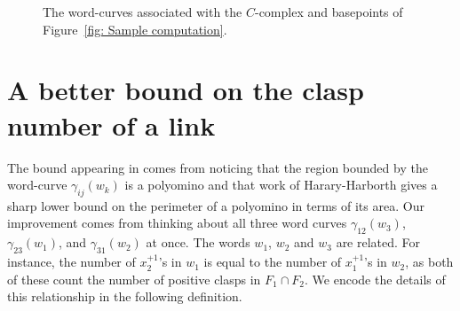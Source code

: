 \documentclass[11pt]{amsart}
\theoremstyle{remark}
\begin{document}
\begin{figure}
\centering
     \hspace{.1\textwidth}
     \hspace{.1\textwidth}
     
        \caption{The word-curves associated with the $C$-complex and basepoints of Figure~\ref{fig: Sample computation}.}
        \label{fig: word curves}
\end{figure}



\section{A better bound on the clasp number of a link} \label{sect: lower bound}

The bound appearing in \cite[Theorem 5]{AADG20} comes from noticing that the region bounded by the word-curve $\gamma_{ij}(w_k)$ is a polyomino and that work of Harary-Harborth \cite{HH76} gives a sharp lower bound on the perimeter of a polyomino in terms of its area.  Our improvement comes from thinking about all three word curves $\gamma_{12}(w_3)$, $\gamma_{23}(w_1)$, and $\gamma_{31}(w_2)$ at once.  The words $w_1$, $w_2$ and $w_3$ are related.  For instance, the number of $x_2^{+1}$'s in $w_1$ is equal to the number of $x_1^{+1}$'s in $w_2$, as both of these count the number of positive clasps in $F_1\cap F_2$.   We encode the details of this relationship in the following definition.
\end{document}
